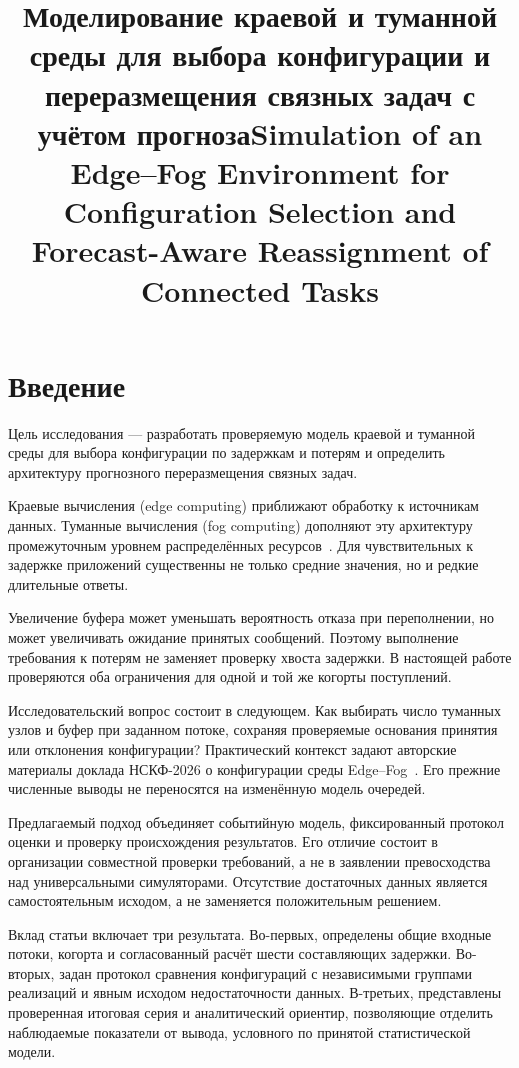 \documentclass{psta}
\title[Моделирование краевой и туманной среды]{Моделирование краевой и туманной среды для выбора конфигурации и переразмещения связных задач с учётом прогноза}
\title[Edge--fog simulation and reassignment]{Simulation of an Edge--Fog Environment for Configuration Selection and Forecast-Aware Reassignment of Connected Tasks}
\begin{document}
\Russian\maketitle
\hypertarget{english--authorsinfo}{}

\section{Введение}\label{sec:introduction}
Цель исследования --- разработать проверяемую модель краевой и туманной среды для выбора конфигурации по задержкам и потерям и определить архитектуру прогнозного переразмещения связных задач.

Краевые вычисления (edge computing) приближают обработку к источникам данных. Туманные вычисления (fog computing) дополняют эту архитектуру промежуточным уровнем распределённых ресурсов~\cite{bonomi,shi}. Для чувствительных к задержке приложений существенны не только средние значения, но и редкие длительные ответы.

Увеличение буфера может уменьшать вероятность отказа при переполнении, но может увеличивать ожидание принятых сообщений. Поэтому выполнение требования к потерям не заменяет проверку хвоста задержки. В настоящей работе проверяются оба ограничения для одной и той же когорты поступлений.

Исследовательский вопрос состоит в следующем. Как выбирать число туманных узлов и буфер при заданном потоке, сохраняя проверяемые основания принятия или отклонения конфигурации? Практический контекст задают авторские материалы доклада НСКФ-2026 о конфигурации среды Edge--Fog~\cite{nskf}. Его прежние численные выводы не переносятся на изменённую модель очередей.

Предлагаемый подход объединяет событийную модель, фиксированный протокол оценки и проверку происхождения результатов. Его отличие состоит в организации совместной проверки требований, а не в заявлении превосходства над универсальными симуляторами. Отсутствие достаточных данных является самостоятельным исходом, а не заменяется положительным решением.

Вклад статьи включает три результата. Во-первых, определены общие входные потоки, когорта и согласованный расчёт шести составляющих задержки. Во-вторых, задан протокол сравнения конфигураций с независимыми группами реализаций и явным исходом недостаточности данных. В-третьих, представлены проверенная итоговая серия и аналитический ориентир, позволяющие отделить наблюдаемые показатели от вывода, условного по принятой статистической модели.
\end{document}
